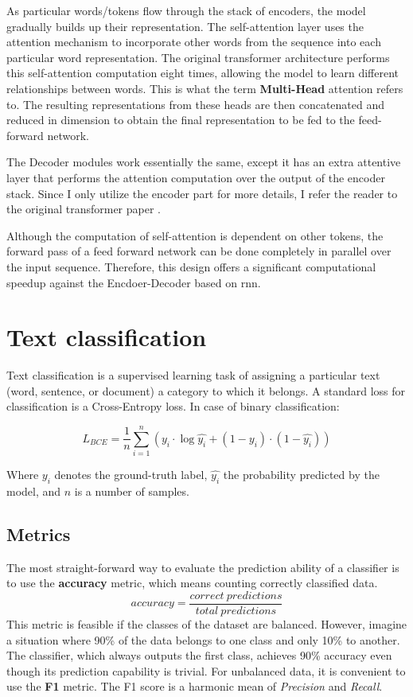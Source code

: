 As particular words/tokens flow through the stack of encoders, the model gradually builds up their representation. The self-attention layer uses the attention mechanism to incorporate other words from the sequence into each particular word representation. The original transformer architecture performs this self-attention computation eight times, allowing the model to learn different relationships between words. This is what the term \textbf{Multi-Head} attention refers to. The resulting representations from these heads are then concatenated and reduced in dimension to obtain the final representation to be fed to the feed-forward network. 

The Decoder modules work essentially the same, except it has an extra attentive layer that performs the attention computation over the output of the encoder stack. Since I only utilize the encoder part for more details, I refer the reader to the original transformer paper \cite{vaswani2017attention}.

Although the computation of self-attention is dependent on other tokens, the forward pass of a feed forward network can be done completely in parallel over the input sequence. Therefore, this design offers a significant computational speedup against the Encdoer-Decoder based on \gls{rnn}.




\section{Text classification}
Text classification is a supervised learning task of assigning a particular text (word, sentence, or document) a category to which it belongs. A standard loss for classification is a Cross-Entropy loss. In case of binary classification:

\begin{equation}
    L_{BCE} = \frac{1}{n} \sum_{i=1}^n ( y_i \cdot \log\hat{y_i} + (1-y_i)\cdot(1-\hat{y_i}))
\end{equation}

Where $y_i$ denotes the ground-truth label, $\hat{y_i}$ the probability predicted by the model, and $n$ is a number of samples.


    
\subsection{Metrics}
The most straight-forward way to evaluate the prediction ability of a classifier is to use the \textbf{accuracy} metric, which means counting correctly classified data. 
\begin{equation}
    accuracy = \frac{correct\ predictions}{total\ predictions}
\end{equation}
This metric is feasible if the classes of the dataset are balanced. However, imagine a situation where 90\% of the data belongs to one class and only 10\% to another. The classifier, which always outputs the first class, achieves 90\% accuracy even though its prediction capability is trivial. For unbalanced data, it is convenient to use the \textbf{F1} metric. The F1 score is a harmonic mean of \textit{Precision} and \textit{Recall}.

